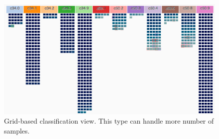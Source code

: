 \documentclass{vgtc}                          %
\begin{document}
\begin{figure}[tbh]
\centering
\includegraphics[width=1.0\linewidth]{grid-mode}
\caption{Grid-based classification view. This type can handle more number of samples.}
\label{fig:grid-mode}
\end{figure}
\end{document}
